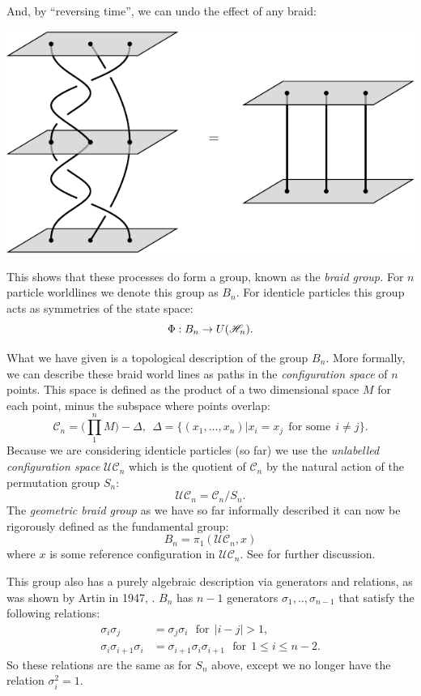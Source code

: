 \documentclass[aps, prl, letterpaper, twocolumn, superscriptaddress, notitlepage, 10pt]{revtex4-1}
\begin{document}
And, by ``reversing time'', we can undo the effect of
any braid:
\begin{center}
\includegraphics[]{pic-braid-inverse.pdf}
\end{center}
This shows that these processes do form a group,
known as the \emph{braid group.}
For $n$ particle worldlines we denote this group as $B_n.$
For identicle particles this group acts as symmetries of the
state space:
$$
    \Phi : B_n \to U(\mathscr{H}_n).
$$

What we have given is a topological description of the group $B_n$.
More formally, we can describe these braid world lines as
paths in the \emph{configuration space} of $n$ points.
\newcommand{\Conf}{\mathcal{C}}
\newcommand{\UConf}{\mathcal{UC}}
This space is defined as the product of
a two dimensional space $M$ for each point, minus the subspace where points overlap:
$$
    \Conf_n = \bigl( \prod_{1}^{n} M \bigr) - \Delta, \ \ 
    \Delta = \{(x_1, ..., x_n) | x_i = x_j \ \ \mbox{for some} \ \ i\ne j \}.
$$
Because we are considering identicle particles (so far)
we use the \emph{unlabelled configuration space}
$\UConf_n$ which is the quotient of $\Conf_n$ by the natural action of the
permutation group $S_n:$
$$
    \UConf_n = \Conf_n / S_n.
$$
The \emph{geometric braid group} as we have so far informally described it 
can now be rigorously defined as the fundamental group:
$$
    B_n = \pi_1 ( \UConf_n, x )
$$
where $x$ is some reference configuration in $\UConf_n.$
See \cite{Ghrist2014} for further discussion.

This group also has a purely algebraic description via
generators and relations, as was shown by Artin in 1947, \cite{Artin1947,Birman1974}.
$B_n$ has $n-1$ generators $\sigma_1,..,\sigma_{n-1}$ that satisfy
the following relations:
\begin{align*}
    \sigma_i \sigma_j &= \sigma_j \sigma_i \ \ \ \mbox{for}\ \ |i-j|>1,\\
    \sigma_i \sigma_{i+1} \sigma_i &= \sigma_{i+1} \sigma_i \sigma_{i+1} \ \ \ \mbox{for}\ \ 1\le i \le n-2.
\end{align*}
So these relations are the same as for $S_n$ above, except 
we no longer have the relation $\sigma_i^2 = 1.$
\end{document}
